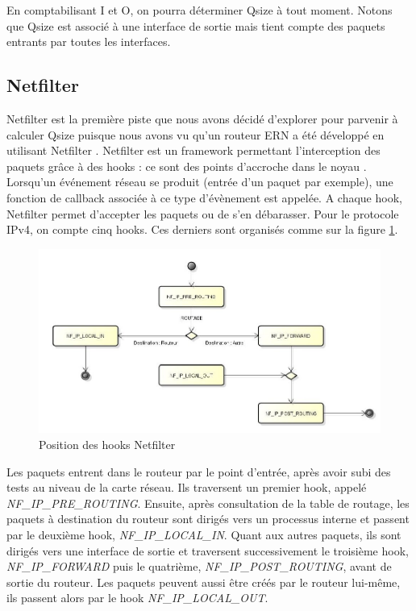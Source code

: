 \documentclass[a4paper]{article}
\begin{document}
En comptabilisant I et O,
on pourra déterminer Qsize à tout moment.
Notons que Qsize est associé à une interface de sortie mais tient compte des paquets entrants par toutes les interfaces.

\subsection{Netfilter}
Netfilter est la première piste que nous avons décidé d'explorer pour 
parvenir à calculer Qsize puisque nous avons vu qu'un routeur ERN a été développé en utilisant Netfilter \cite{}.
Netfilter est un framework permettant l'interception des paquets
grâce à des hooks : ce sont des points d'accroche dans le noyau \cite{netfilter1}.
Lorsqu'un événement réseau se produit (entrée d'un paquet par exemple),
une fonction de callback associée à ce type d'évènement est appelée.
A chaque hook, Netfilter permet d'accepter les paquets ou de s'en
débarasser. Pour le protocole IPv4, on compte cinq hooks. Ces derniers
sont organisés comme sur la figure \ref{hooks}.

\begin{figure}[!ht]
	\centering
	\includegraphics[scale=.5]{hooks.jpg}
	\caption{\label{hooks} Position des hooks Netfilter}
\end{figure}

Les paquets entrent dans le routeur par le point d'entrée, après avoir 
subi des tests au niveau de la carte réseau. Ils traversent un premier 
hook, appelé \textit{NF\_IP\_PRE\_ROUTING}. Ensuite, après consultation de la table 
de routage, les paquets à destination du routeur sont dirigés vers un 
processus interne et passent par le deuxième hook, \textit{NF\_IP\_LOCAL\_IN}. 
Quant aux autres paquets, ils sont dirigés vers une interface de sortie 
et traversent successivement le troisième hook, \textit{NF\_IP\_FORWARD} puis le 
quatrième, \textit{NF\_IP\_POST\_ROUTING}, avant de sortie du routeur. Les paquets 
peuvent aussi être créés par le routeur lui-même, ils passent alors 
par le hook \textit{NF\_IP\_LOCAL\_OUT}.
\end{document}
